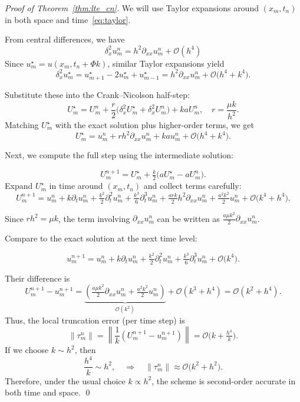 \begin{proof}[Proof of Theorem~\ref{thm:lte_cn}]

  We will use Taylor expansions around $(x_m, t_n)$ in both space and time~\ref{eq:taylor}.

  From central differences, we have
  \[
    \delta_x^2 u_m^n = h^2\partial_{xx}u_m^n + \mathcal{O}(h^4)
  \]
  Since $u_m^\star = u(x_m, t_n+\Phi k)$, similar Taylor expansions yield
  \[
    \delta_x^2 u_m^\star
    = u_{m+1}^\star - 2u_m^\star + u_{m-1}^\star
    = h^2\partial_{xx}u_m^n + \mathcal{O}\bigl(h^4 + k^4\bigr).
  \]

  Substitute these into the Crank--Nicolson half-step:
  \[
    U_m^\star
    = U_m^n
    + \frac{r}{2}\bigl(\delta_x^2 U_m^\star + \delta_x^2 U_m^n\bigr)
    + kaU_m^n,
    \quad
    r = \frac{\mu k}{h^2}.
  \]
  Matching $U_m^\star$ with the exact solution plus higher-order terms, we get
  \[
    U_m^\star
    = u_m^n
    + rh^2\partial_{xx}u_m^n
    + kau_m^n
    + \mathcal{O}\bigl(h^4 + k^4\bigr).
  \]

  Next, we compute the full step using the intermediate solution:

  \[
    U_m^{n+1}
    = U_m^\star
    + \tfrac{k}{2}\bigl(aU_m^\star - aU_m^n\bigr).
  \]
  Expand $U_m^\star$ in time around $(x_m,t_n)$ and collect terms carefully:
  \[
    U_m^{n+1}
    = u_m^n
    + k\partial_t u_m^n
    + \tfrac{k^2}{2}\partial_t^2 u_m^n
    + \tfrac{k^3}{6}\partial_t^3 u_m^n
    + \tfrac{ark}{2}h^2\partial_{xx} u_m^n
    + \tfrac{a^2k^2}{2}u_m^n
    + \mathcal{O}\bigl(k^4 + h^4\bigr).
  \]

  Since $rh^2 = \mu k$, the term involving $\partial_{xx} u_m^n$ can be written as
  $\tfrac{a\mu k^2}{2}\partial_{xx}u_m^n$.

  Compare to the exact solution at the next time level:

  \[
    u_m^{n+1}
    = u_m^n
    + k\partial_t u_m^n
    + \tfrac{k^2}{2}\partial_t^2 u_m^n
    + \tfrac{k^3}{6}\partial_t^3 u_m^n
    + \mathcal{O}\bigl(k^4\bigr).
  \]

  Their difference is
  \[
    U_m^{n+1} - u_m^{n+1} =
    \underbrace{\left(\tfrac{a\mu k^2}{2}\partial_{xx}u_m^n
      + \tfrac{a^2k^2}{2}u_m^n\right)}_{\mathcal{O}(k^2)}
    + \mathcal{O}\left(k^3 + h^4\right)
    = \mathcal{O}\left(k^2 + h^4\right).
  \]
  Thus, the local truncation error (per time step) is
  \[
    \lVert{\tau_m^n}\rVert
    = \left\lVert\dfrac{1}{k}\left(U_m^{n+1} - u_m^{n+1}\right) \right\rVert
    = \mathcal{O}\bigl(k + \tfrac{h^4}{k}\bigr).
  \]
  If we choose $k \sim h^2$, then
  \[
    \frac{h^4}{k} \sim h^2,
    \quad
    \Rightarrow
    \quad
    \lVert{\tau_m^n}\rVert \approx \mathcal{O}\bigl(k^2 + h^2\bigr).
  \]
  Therefore, under the usual choice $k \propto h^2$, the scheme is second-order accurate in both time and space. \qed
\end{proof}

